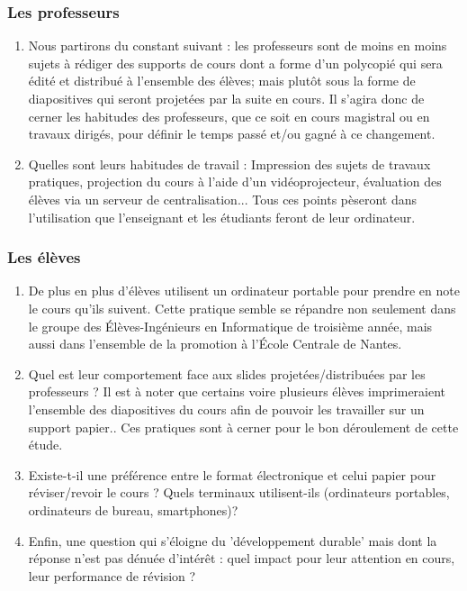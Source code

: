 \documentclass[a4paper,11pt,french]{article}
\begin{document}
\subsubsection{Les professeurs}
\begin{enumerate}
\item Nous partirons du constant suivant : les professeurs sont de moins en moins sujets à rédiger des supports de cours dont a forme d'un polycopié qui sera édité et distribué à l'ensemble des élèves; mais plutôt sous la forme de diapositives qui seront projetées par la suite en cours. Il s'agira donc de cerner les habitudes des professeurs, que ce soit en cours magistral ou en travaux dirigés, pour définir le temps passé et/ou gagné à ce changement.
\item Quelles sont leurs habitudes de travail : Impression des sujets de travaux pratiques, projection du cours à l'aide d'un vidéoprojecteur, évaluation des élèves via un serveur de centralisation... Tous ces points pèseront dans l'utilisation que l'enseignant et les étudiants feront de leur ordinateur.
\end{enumerate}


\subsubsection{Les élèves}
\begin{enumerate}
\item De plus en plus d'élèves utilisent un ordinateur portable pour prendre en note le cours qu'ils suivent. Cette pratique semble se répandre non seulement dans le groupe des Élèves-Ingénieurs en Informatique de troisième année, mais aussi dans l'ensemble de la promotion à l'École Centrale de Nantes.
\item Quel est leur comportement face aux slides projetées/distribuées par les professeurs ? Il est à noter que certains voire plusieurs élèves imprimeraient l'ensemble des diapositives du cours afin de pouvoir les travailler sur un support papier.. Ces pratiques sont à cerner pour le bon déroulement de cette étude.
\item Existe-t-il une préférence entre le format électronique et celui papier pour réviser/revoir le cours ? Quels terminaux utilisent-ils (ordinateurs portables, ordinateurs de bureau, smartphones)?
\item Enfin, une question qui s'éloigne du 'développement durable' mais dont la réponse n'est pas dénuée d'intérêt : quel impact pour leur attention en cours, leur performance de révision ?
\end{enumerate}
\end{document}
